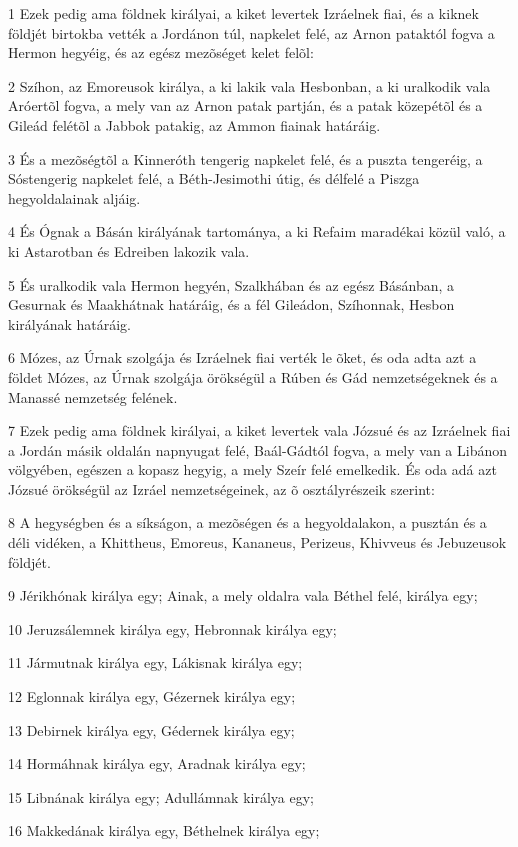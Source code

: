 \par 1 Ezek pedig ama földnek királyai, a kiket levertek Izráelnek fiai, és a kiknek földjét birtokba vették a Jordánon túl, napkelet felé, az Arnon pataktól fogva a Hermon hegyéig, és az egész mezõséget kelet felõl:
\par 2 Szíhon, az Emoreusok királya, a ki lakik vala Hesbonban, a ki uralkodik vala Aróertõl fogva, a mely van az Arnon patak partján, és a patak közepétõl és a Gileád felétõl  a Jabbok patakig, az Ammon fiainak határáig.
\par 3 És a mezõségtõl a Kinneróth tengerig napkelet felé, és a puszta tengeréig, a Sóstengerig napkelet felé, a Béth-Jesimothi útig, és délfelé a Piszga hegyoldalainak aljáig.
\par 4 És Ógnak a Básán királyának tartománya, a ki Refaim maradékai közül való, a ki Astarotban és Edreiben lakozik vala.
\par 5 És uralkodik vala Hermon hegyén, Szalkhában és az egész Básánban, a Gesurnak és Maakhátnak határáig, és a fél Gileádon, Szíhonnak, Hesbon királyának határáig.
\par 6 Mózes, az Úrnak szolgája és Izráelnek fiai verték le õket, és oda adta azt a földet Mózes, az Úrnak szolgája örökségül a Rúben és Gád nemzetségeknek és a Manassé nemzetség felének.
\par 7 Ezek pedig ama földnek királyai, a kiket levertek vala Józsué és az Izráelnek fiai a Jordán másik oldalán napnyugat felé, Baál-Gádtól fogva, a mely van a Libánon völgyében, egészen a  kopasz hegyig, a mely Szeír felé emelkedik. És oda adá azt Józsué örökségül az Izráel nemzetségeinek, az õ osztályrészeik szerint:
\par 8 A hegységben és a síkságon, a mezõségen és a hegyoldalakon, a pusztán és a déli vidéken, a  Khittheus, Emoreus, Kananeus, Perizeus, Khivveus és Jebuzeusok földjét.
\par 9 Jérikhónak királya egy; Ainak, a mely oldalra vala Béthel felé,  királya egy;
\par 10 Jeruzsálemnek királya egy, Hebronnak  királya egy;
\par 11 Jármutnak királya egy, Lákisnak királya egy;
\par 12 Eglonnak királya egy, Gézernek királya  egy;
\par 13 Debirnek királya egy, Gédernek királya egy;
\par 14 Hormáhnak királya egy, Aradnak királya egy;
\par 15 Libnának királya egy; Adullámnak királya egy;
\par 16 Makkedának királya egy, Béthelnek királya egy;
